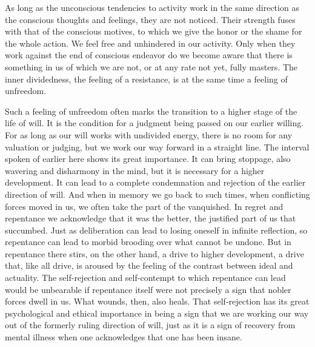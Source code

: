 \documentclass[12pt,a4paper]{book}
\begin{document}
As long as the unconscious tendencies to activity work in the same
direction as the conscious thoughts and feelings, they are not noticed.
Their strength fuses with that of the conscious motives, to which we give
the honor or the shame for the whole action. We feel free and unhindered
in our activity. Only when they work against the end of conscious
endeavor do we become aware that there is something in us of which we are
not, or at any rate not yet, fully masters. The inner dividedness, the
feeling of a resistance, is at the same time a feeling of unfreedom.

Such a feeling of unfreedom often marks the transition to a higher stage
of the life of will. It is the condition for a judgment being passed on
our earlier willing. For as long as our will works with undivided energy,
there is no room for any valuation or judging, but we work our way
forward in a straight line. The interval spoken of earlier here shows its
great importance. It can bring stoppage, also wavering and disharmony in
the mind, but it is necessary for a higher development. It can lead to a
complete condemnation and rejection of the earlier direction of will. And
when in memory we go back to such times, when conflicting forces moved in
us, we often take the part of the vanquished. In regret and repentance we
acknowledge that it was the better, the justified part of us that
succumbed. Just as deliberation can lead to losing oneself in infinite
reflection, so repentance can lead to morbid brooding over what cannot be
undone. But in repentance there stirs, on the other hand, a drive to
higher development, a drive that, like all drive, is aroused by the
feeling of the contrast between ideal and actuality. The self-rejection
and self-contempt to which repentance can lead would be unbearable if
repentance itself were not precisely a sign that nobler forces dwell in
us. What wounds, then, also heals. That self-rejection has its great
psychological and ethical importance in being a sign that we are working
our way out of the formerly ruling direction of will, just as it is a
sign of recovery from mental illness when one acknowledges that one has
been insane.
\end{document}
